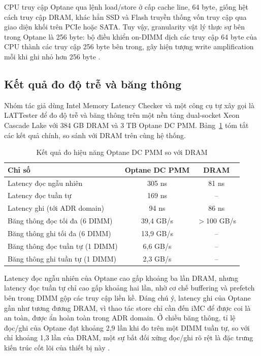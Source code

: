 \documentclass[12pt,a4paper]{article}
\begin{document}
CPU truy cập Optane qua lệnh load/store ở cấp cache line, 64 byte, giống hệt cách truy cập DRAM, khác hẳn SSD và Flash truyền thống vốn truy cập qua giao diện khối trên PCIe hoặc SATA. Tuy vậy, granularity vật lý thực sự bên trong Optane là 256 byte: bộ điều khiển on-DIMM dịch các truy cập 64 byte của CPU thành các truy cập 256 byte bên trong, gây hiện tượng write amplification mỗi khi ghi nhỏ hơn 256 byte \cite{izraelevitz2019}.

\subsection{Kết quả đo độ trễ và băng thông}

Nhóm tác giả dùng Intel Memory Latency Checker và một công cụ tự xây gọi là LATTester để đo độ trễ và băng thông trên một nền tảng dual-socket Xeon Cascade Lake với 384 GB DRAM và 3 TB Optane DC PMM. Bảng~\ref{tab:optane-results} tóm tắt các kết quả chính, so sánh với DRAM trên cùng hệ thống.

\begin{table}[h]
\centering
\caption{Kết quả đo hiệu năng Optane DC PMM so với DRAM \cite{izraelevitz2019}}
\label{tab:optane-results}
\begin{tabular}{lcc}
\toprule
\textbf{Chỉ số} & \textbf{Optane DC PMM} & \textbf{DRAM} \\
\midrule
Latency đọc ngẫu nhiên & 305 ns & 81 ns \\
Latency đọc tuần tự & 169 ns & -- \\
Latency ghi (tới ADR domain) & 94 ns & 86 ns \\
Băng thông đọc tối đa (6 DIMM) & 39,4 GB/s & $>$100 GB/s \\
Băng thông ghi tối đa (6 DIMM) & 13,9 GB/s & -- \\
Băng thông đọc tuần tự (1 DIMM) & 6,6 GB/s & -- \\
Băng thông ghi tuần tự (1 DIMM) & 2,3 GB/s & -- \\
\bottomrule
\end{tabular}
\end{table}

Latency đọc ngẫu nhiên của Optane cao gấp khoảng ba lần DRAM, nhưng latency đọc tuần tự chỉ cao gấp khoảng hai lần, nhờ cơ chế buffering và prefetch bên trong DIMM gộp các truy cập liền kề. Đáng chú ý, latency ghi của Optane gần như tương đương DRAM, vì thao tác store chỉ cần đến iMC để được coi là an toàn, được ẩn hoàn toàn trong ADR domain. Ở chiều băng thông, tỉ lệ đọc/ghi của Optane đạt khoảng 2,9 lần khi đo trên một DIMM tuần tự, so với chỉ khoảng 1,3 lần của DRAM, một sự bất đối xứng đọc/ghi rõ rệt là đặc trưng kiến trúc cốt lõi của thiết bị này \cite{izraelevitz2019}.
\end{document}
